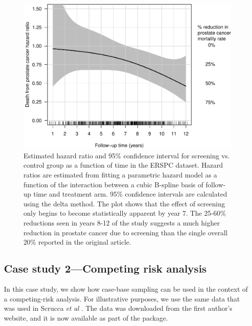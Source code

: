 \begin{Schunk}
\begin{figure}[ht]
\includegraphics[width=\textwidth,keepaspectratio=true]{./interaction-ERSPC-1} \caption[Estimated hazard ratio and 95\% confidence interval for screening vs]{Estimated hazard ratio and 95\% confidence interval for screening vs. control group as a function of time in the ERSPC dataset. Hazard ratios are estimated from fitting a parametric hazard model as a function of the interaction between a cubic B-spline basis of follow-up time and treatment arm. 95\% confidence intervals are calculated using the delta method. The plot shows that the effect of screening only begins to become statistically apparent by year 7. The 25-60\% reductions seen in years 8-12 of the study suggests a much higher reduction in prostate cancer due to screening than the single overall 20\% reported in the original article.}\label{fig:interaction-ERSPC}
\end{figure}
\end{Schunk}

\hypertarget{case-study-2competing-risk-analysis}{%
\subsection{Case study 2---Competing risk
analysis}\label{case-study-2competing-risk-analysis}}

In this case study, we show how case-base sampling can be used in the
context of a competing-risk analysis. For illustrative purposes, we use
the same data that was used in Scrucca \emph{et al}
\citeyearpar{scrucca2010regression}. The data was downloaded from the
first author's website, and it is now available as part of the
 package.

